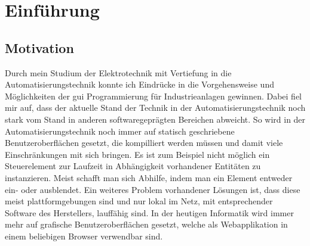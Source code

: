 \chapter{Einführung}
\section{Motivation}
Durch mein Studium der Elektrotechnik mit Vertiefung in die Automatisierungstechnik konnte ich Eindrücke in die Vorgehensweise und 
Möglichkeiten der \ac{gui} Programmierung für Industrieanlagen gewinnen. %
Dabei fiel mir auf, dass der aktuelle Stand der Technik in  der Automatisierungstechnik noch stark 
vom Stand in anderen softwaregeprägten Bereichen abweicht.
So wird in der Automatisierungstechnik noch immer auf statisch geschriebene Benutzeroberflächen gesetzt, 
die kompilliert werden müssen und damit viele Einschränkungen mit sich bringen.
Es ist zum Beispiel nicht möglich ein Steuerelement zur Laufzeit in Abhängigkeit vorhandener Entitäten zu instanzieren. 
Meist schafft man sich Abhilfe, indem man ein Element entweder ein- oder ausblendet.
Ein weiteres Problem vorhandener Lösungen ist, dass diese meist plattformgebungen sind und nur lokal im Netz, 
mit entsprechender Software des Herstellers, lauffähig sind.
In der heutigen Informatik wird immer mehr auf grafische Benutzeroberflächen gesetzt, 
welche als Webapplikation in einem beliebigen Browser verwendbar sind.

